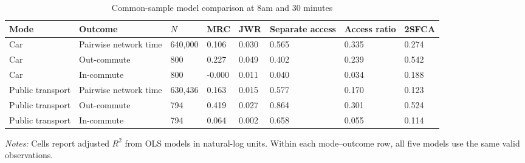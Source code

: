 \begin{table}[htbp]
\centering
\scriptsize
\caption{Common-sample model comparison at 8am and 30 minutes}
\label{tab:r2summary}
\begin{tabular}{llllllll}
\toprule
Mode & Outcome & $N$ & MRC & JWR & Separate access & Access ratio & 2SFCA \\
\midrule
Car & Pairwise network time & 640,000 & 0.106 & 0.030 & 0.565 & 0.335 & 0.274 \\
Car & Out-commute & 800 & 0.227 & 0.049 & 0.402 & 0.239 & 0.542 \\
Car & In-commute & 800 & -0.000 & 0.011 & 0.040 & 0.034 & 0.188 \\
Public transport & Pairwise network time & 630,436 & 0.163 & 0.015 & 0.577 & 0.170 & 0.123 \\
Public transport & Out-commute & 794 & 0.419 & 0.027 & 0.864 & 0.301 & 0.524 \\
Public transport & In-commute & 794 & 0.064 & 0.002 & 0.658 & 0.055 & 0.114 \\
\bottomrule
\end{tabular}
\par\vspace{2pt}
\begin{minipage}{0.96\linewidth}\footnotesize\textit{Notes:} Cells report adjusted $R^2$ from OLS models in natural-log units. Within each mode--outcome row, all five models use the same valid observations.
\end{minipage}
\end{table}
